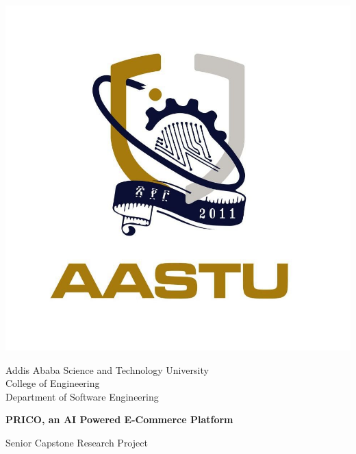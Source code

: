 \documentclass[12pt]{report}
\begin{document}
\begin{titlepage}
	\setlength{\parskip}{0pt}
	\singlespacing
	\begin{center}
		\includegraphics[width=0.4\linewidth]{aastu}

		\Large
		Addis Ababa Science and Technology University \\
		College of Engineering \\
		Department of Software Engineering

		\vspace*{1.5cm}

		\Huge
		\textbf{PRICO, an AI Powered E-Commerce Platform}

		\vspace{0.25cm}

		\LARGE
		Senior Capstone Research Project

		\vspace{1.25cm}

		\vfill
	\end{center}
\end{titlepage}
\end{document}
